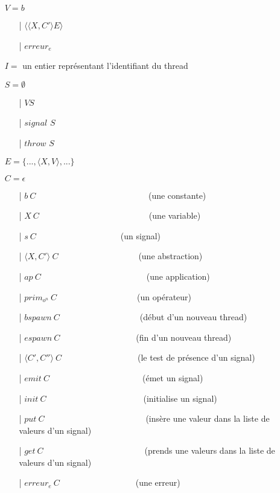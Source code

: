 \documentclass[10pt,a4paper]{article}
\begin{document}
				\begin{itemize}
					\item[] $V = b$	
					\begin{itemize}
						\item[|] $\langle\langle X,C' \rangle E\rangle$
						\item[|] $erreur_{e}$
					\end{itemize}
					\item[] $I =$ un entier représentant l'identifiant du thread
					\item[] $S =  \emptyset$ 
					\begin{itemize}
						\item[|] $V S$
						\item[|] $signal$ $S$
						\item[|] $throw$ $S$
					\end{itemize}
					\item[] $E = \{...,\langle X,V\rangle,...\}$
					\item[] $C = \epsilon$
					\begin{itemize}
						\item[|] $b~C$~~~~~~~~~~~~~~~~~~~~~~~~~~    (une constante)
						\item[|] $X~C$~~~~~~~~~~~~~~~~~~~~~~~~~~(une variable)
						\item[|] $s~C$~~~~~~~~~~~~~~~~~~~~(un signal)
						\item[|] $\langle X,C'\rangle~C$~~~~~~~~~~~~~~~~~~~(une abstraction)
						\item[|] $ap~C$~~~~~~~~~~~~~~~~~~~~~~~~~(une application)
						\item[|] $prim_{o^{n}}~C$~~~~~~~~~~~~~~~~~~~(un opérateur)
						\item[|] $bspawn~C$~~~~~~~~~~~~~~~~~~~(début d'un nouveau thread)
						\item[|] $espawn~C$~~~~~~~~~~~~~~~~~~(fin d'un nouveau thread)
						\item[|] $\langle C',C''\rangle~C$~~~~~~~~~~~~~~~~~~(le test de présence d'un signal)
						\item[|] $emit~C$~~~~~~~~~~~~~~~~~~~~~~(émet un signal)
						\item[|] $init~C$~~~~~~~~~~~~~~~~~~~~~~~(initialise un signal)
						\item[|] $put~C$~~~~~~~~~~~~~~~~~~~~~~~~(insère une valeur dans la liste de valeurs d'un signal)
						\item[|] $get~C$~~~~~~~~~~~~~~~~~~~~~~~~(prends une valeurs dans la liste de valeurs d'un signal)
						\item[|] $erreur_{e}~C$~~~~~~~~~~~~~~~~~~(une erreur)

\end{itemize}
\end{itemize}
\end{document}
